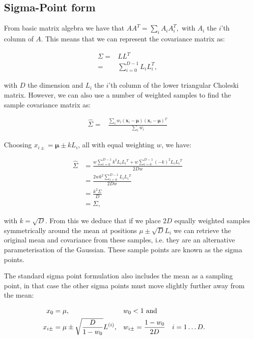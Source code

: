 \subsection{Sigma-Point form }

From basic matrix algebra we have that $AA^{T}=\sum_{i}A_{i}A_{i}^{T},$
with $A_{i}$ the $i$'th column of $A$. This means that we can represent
the covariance matrix as:

\begin{align*}
\Sigma= & LL^{T}\\
= & \sum_{i=0}^{D-1}L_{i}L_{i}^{T},
\end{align*}


with $D$ the dimension and $L_{i}$ the $i$'th column of the lower
triangular Choleski matrix. However, we can also use a number of weighted
samples to find the sample covariance matrix as:

\begin{align*}
\hat{\Sigma}= & \frac{\sum_{i}w_{i}(\mathbf{x}_{i}-\mathbf{\mu})(\mathbf{x}_{i}-\mathbf{\mu}){}^{T}}{\sum_{i}w_{i}}
\end{align*}


Choosing $x_{i\pm}=\mathbf{\mu}\pm kL_{i}$, all with equal weighting
$w$, we have:

\begin{align*}
\hat{\Sigma} & =\frac{w\sum_{i=0}^{D-1}k^{2}L{}_{i}L{}_{i}{}^{T}+w\sum_{i=0}^{D-1}(-k)^{2}L{}_{i}L{}_{i}{}^{T}}{2Dw}\\
 & =\frac{2wk^{2}\sum_{i=0}^{D-1}L{}_{i}L{}_{i}{}^{T}}{2Dw}\\
 & =\frac{k^{2}\Sigma}{D}\\
 & =\Sigma,
\end{align*}


with $k=\sqrt{D}$. From this we deduce that if we place $2D$ equally
weighted samples symmetrically around the mean at positions $\mu\pm\sqrt{D}L_{i}$
we can retrieve the original mean and covariance from these samples,
i.e. they are an alternative parameterisation of the Gaussian. These
sample points are known as the sigma points.

The standard sigma point formulation also includes the mean as a sampling
point, in that case the other sigma points must move slightly further
away from the mean:

\begin{align}
x_0   &={\mathbf\mu}, && w_0 < 1 \text{ and} \\
x_{i\pm}&={\mathbf\mu}\pm\sqrt{\frac{D}{1-w_0}}L^{(i)},&&w_{i\pm}=\frac{1-w_0}{2D}&& i = 1\dots D. \label{eq:sigma-point}
\end{align}

